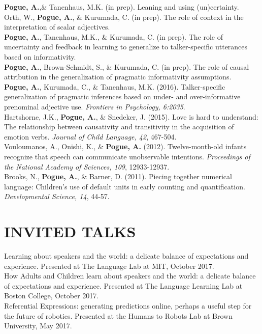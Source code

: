 \documentclass[margin, 7pt]{res} %
\begin{document}
\begin{resume}
{\bf Pogue, A.},\& Tanenhaus, M.K. (in prep). Leaning and using (un)certainty.\medskip \\
Orth, W., {\bf Pogue, A.}, \& Kurumada, C. (in prep). The role of context in the interpretation of scalar adjectives. \medskip \\
{\bf Pogue, A.}, Tanenhaus, M.K., \& Kurumada, C. (in prep). The role of uncertainty and feedback in learning to generalize to talker-specific utterances based on informativity.\medskip \\
{\bf Pogue, A.}, Brown-Schmidt, S., \& Kurumada, C. (in prep). The role of causal attribution in the generalization of pragmatic informativity assumptions. \medskip \\
{\bf Pogue, A.}, Kurumada, C., \& Tanenhaus, M.K. (2016). Talker-specific generalization of pragmatic inferences based on under- and over-informative prenominal adjective use. {\sl Frontiers in Psychology,  6:2035}. \medskip \\
Hartshorne, J.K., {\bf Pogue, A.}, \& Snedeker, J. (2015). Love is hard to understand: The relationship between causativity and transitivity in the acquisition of emotion verbs. {\sl Journal of Child Language, 42}, 467-504. \medskip \\
Vouloumanos, A., Onishi, K., \& {\bf Pogue, A.} (2012). Twelve-month-old infants recognize that speech can communicate unobservable intentions. {\sl Proceedings of the National Academy of Sciences, 109}, 12933-12937. \medskip \\
Brooks, N., {\bf Pogue, A.}, \& Barner, D. (2011). Piecing together numerical language: Children's use of default units in early counting and quantification. {\sl Developmental Science, 14}, 44-57. \\

 
 \section{INVITED TALKS}
Learning about speakers and the world: a delicate balance of expectations and experience. Presented at The Language Lab at MIT, October 2017. \medskip \\
How Adults and Children learn about speakers and the world: a delicate balance of expectations and experience. Presented at The Language Learning Lab at Boston College, October 2017.\medskip \\
\pagebreak
Referential Expressions: generating predictions online, perhaps a useful step for the future of robotics. Presented at the Humans to Robots Lab at Brown University, May 2017. \medskip \\



\end{resume}
\end{document}
